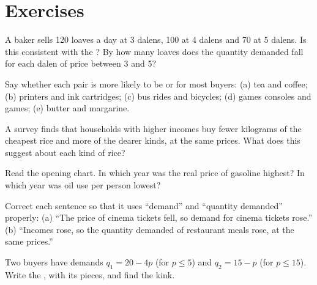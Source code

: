 \section{Exercises}

\begin{exercise}[$\star$]\label{exo:g10:demand:1}
A baker sells 120 loaves a day at 3 dalens, 100 at 4 dalens and 70 at 5 dalens. Is this consistent with the ?
By how many loaves does the quantity demanded fall for each dalen of price between 3 and 5?
\end{exercise}

\begin{exercise}[$\star$]\label{exo:g10:demand:2}
Say whether each pair is more likely to be  or  for most buyers: (a) tea and coffee; (b) printers and
ink cartridges; (c) bus rides and bicycles; (d) games consoles and games; (e) butter and margarine.
\end{exercise}

\begin{exercise}[$\star$]\label{exo:g10:demand:3}
A survey finds that households with higher incomes buy fewer kilograms of the cheapest rice and more of the dearer kinds,
at the same prices. What does this suggest about each kind of rice?
\end{exercise}

\begin{exercise}[$\star$]\label{exo:g10:demand:4}
Read the opening chart. In which year was the real price of gasoline highest? In which year was oil use per person lowest?
\end{exercise}

\begin{exercise}[$\star$]\label{exo:g10:demand:5}
Correct each sentence so that it uses ``demand'' and ``quantity demanded'' properly: (a) ``The price of cinema tickets fell,
so demand for cinema tickets rose.'' (b) ``Incomes rose, so the quantity demanded of restaurant meals rose, at the same
prices.''
\end{exercise}

\begin{exercise}[$\star\star$]\label{exo:g10:demand:6}
Two buyers have demands $q_1 = 20 - 4p$ (for $p \le 5$) and $q_2 = 15 - p$ (for $p \le 15$). Write the , with its
pieces, and find the kink.
\end{exercise}

